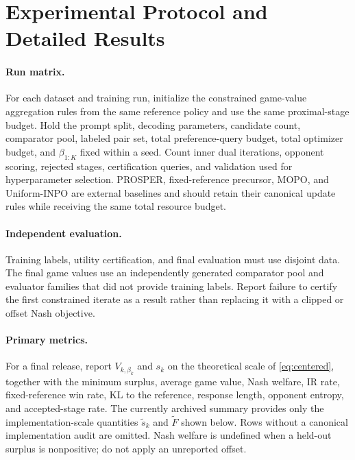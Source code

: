 \documentclass{article}
\theoremstyle{remark}
\theoremstyle{plain}
\begin{document}
\section{Experimental Protocol and Detailed Results}
\label{app:protocol}
\paragraph{Run matrix.}
For each dataset and training run, initialize the constrained game-value aggregation rules from the same reference policy and use the same proximal-stage budget. Hold the prompt split, decoding parameters, candidate count, comparator pool, labeled pair set, total preference-query budget, total optimizer budget, and $\beta_{1:K}$ fixed within a seed. Count inner dual iterations, opponent scoring, rejected stages, certification queries, and validation used for hyperparameter selection. PROSPER, fixed-reference precursor, MOPO, and Uniform-INPO are external baselines and should retain their canonical update rules while receiving the same total resource budget.

\paragraph{Independent evaluation.}
Training labels, utility certification, and final evaluation must use disjoint data. The final game values use an independently generated comparator pool and evaluator families that did not provide training labels. Report failure to certify the first constrained iterate as a result rather than replacing it with a clipped or offset Nash objective.

\paragraph{Primary metrics.}
For a final release, report $V_{k,\beta_k}$ and $s_k$ on the theoretical scale of \eqref{eq:centered}, together with the minimum surplus, average game value, Nash welfare, IR rate, fixed-reference win rate, KL to the reference, response length, opponent entropy, and accepted-stage rate. The currently archived summary provides only the implementation-scale quantities $\widetilde s_k$ and $\widetilde F$ shown below. Rows without a canonical implementation audit are omitted. Nash welfare is undefined when a held-out surplus is nonpositive; do not apply an unreported offset.
\end{document}
